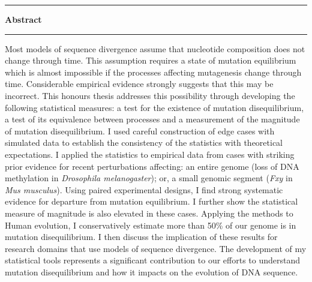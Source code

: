 \thispagestyle{plain}
\begin{center}
    
    \vspace{0.8cm}
    \rule{18cm}{0.5pt}
    \raggedright
    
    \huge

    \textbf{Abstract}\\
    \rule{18cm}{0.5pt}
    
    \vspace{3cm}
    
    \normalsize
    
    Most models of sequence divergence assume that nucleotide composition does not change through time. This assumption requires a state of mutation equilibrium which is almost impossible if the processes affecting mutagenesis change through time. Considerable empirical evidence strongly suggests that this may be incorrect. This honours thesis addresses this possibility through developing the following statistical measures: a test for the existence of mutation disequilibrium, a test of its equivalence between processes and a measurement of the magnitude of mutation disequilibrium. I used careful construction of edge cases with simulated data to establish the consistency of the statistics with theoretical expectations. I applied the statistics to empirical data from cases with striking prior evidence for recent perturbations affecting: an entire genome (loss of DNA methylation in \textit{Drosophila melanogaster}); or, a small genomic segment (\textit{Fxy} in \textit{Mus musculus}). Using paired experimental designs, I find strong systematic evidence for departure from mutation equilibrium. I further show the statistical measure of magnitude is also elevated in these cases. Applying the methods to Human evolution, I conservatively estimate more than 50\% of our genome is in mutation disequilibrium. I then discuss the implication of these results for research domains that use models of sequence divergence. The development of my statistical tools represents a significant contribution to our efforts to understand mutation disequilibrium and how it impacts on the evolution of DNA sequence. 
    


\end{center}